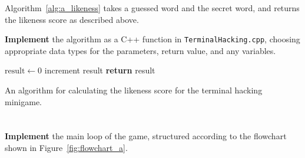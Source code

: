 \documentclass{../../../fal_assignment}
\begin{document}
Algorithm~\ref{alg:a_likeness} takes a guessed word and the secret word, and returns the likeness score as described above.

\textbf{Implement} the algorithm as a C++ function in \texttt{TerminalHacking.cpp}, choosing appropriate data types for the parameters, return value, and any variables.

\begin{algorithm}[t]
	\begin{algorithmic}
		\State $\text{result} \gets 0$
		\State increment result
		\EndIf
		\EndFor
		\State \textbf{return} result
		\EndProcedure
	\end{algorithmic}
	\caption{An algorithm for calculating the likeness score for the terminal hacking minigame.}
	\label{alg:a_likeness}
\end{algorithm}

\section{} \label{core-a-last}

\textbf{Implement} the main loop of the game, structured
according to the flowchart shown in Figure~\ref{fig:flowchart_a}.
\end{document}
